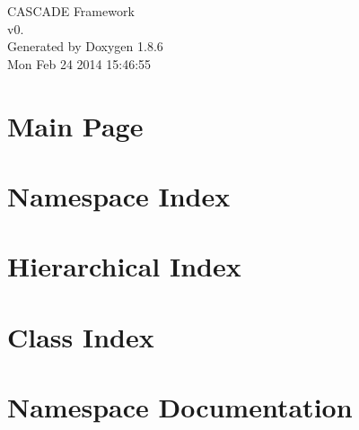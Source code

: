 \documentclass[twoside]{book}
\newcommand{\clearemptydoublepage}{%
  \newpage{\pagestyle{empty}\cleardoublepage}%
}
\begin{document}
\hypersetup{pageanchor=false}
\begin{titlepage}
\vspace*{7cm}
\begin{center}%
{\Large C\-A\-S\-C\-A\-D\-E Framework \\[1ex]\large v0. }\\
\vspace*{1cm}
{\large Generated by Doxygen 1.8.6}\\
\vspace*{0.5cm}
{\small Mon Feb 24 2014 15:46:55}\\
\end{center}
\end{titlepage}
\clearemptydoublepage
\tableofcontents
\clearemptydoublepage
{}
\hypersetup{pageanchor=true}

\chapter{Main Page}
\label{index}\hypertarget{index}{}
\chapter{Namespace Index}

\chapter{Hierarchical Index}

\chapter{Class Index}

\chapter{Namespace Documentation}




















\end{document}
